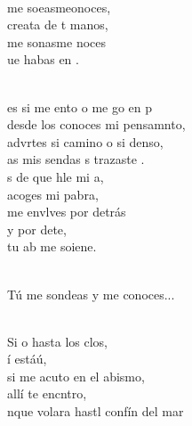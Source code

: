 \documentclass[12pt]{article}
\begin{document}
\begin{multicols*}{2}
\begin{cancion}%
	\begin{chorus}%
	       \\
	 me soeasmeonoces, \\
	 creata de t manos, \\
	 me sonasme noces \\
	ue habas en . \\
	\end{chorus}%
	\jump\\
	es si me ento o me go en p \\
	desde los conoces mi pensamnto, \\
	advrtes si camino o si denso, \\
	as mis sendas s trazaste .  \\
\jump
	s de que hle mi a, \\
	 acoges mi pabra,  \\
	me envlves por detrás \\
	y por dete,\\
	tu ab me soiene.\\\jump\\
	\begin{chorus}%
Tú me sondeas y me conoces... \\
	\end{chorus}%
	\jump\\
	Si o hasta los clos,\\
	í estáú, \\
	si me acuto en el abismo, \\
	allí te encntro, \\
	nque volara hastl confín del mar\\

\end{cancion}
\end{multicols*}
\end{document}
